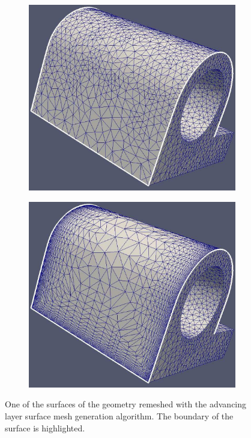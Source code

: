 \documentclass[conf]{new-aiaa}
\begin{document}
\begin{figure}[hbt!]
\begin{subfigure}{.5\textwidth}
  \caption{}
  \label{surf5-joint-view2}
\end{subfigure}
\begin{subfigure}{.5\textwidth}
  \centering
  \includegraphics[width=.9\linewidth]{joint-surf5/before2.eps}
  \caption{}
  \label{surf5-joint-view3}
\end{subfigure}%
\begin{subfigure}{.5\textwidth}
  \centering
  \includegraphics[width=.9\linewidth]{joint-surf5/after2.eps}
  \caption{}
  \label{surf5-joint-view4}
\end{subfigure}
\caption{One of the surfaces of the geometry remeshed with the advancing layer surface mesh generation algorithm. The boundary of the surface is highlighted.}
\label{joint-surf5}
\end{figure}
\end{document}
